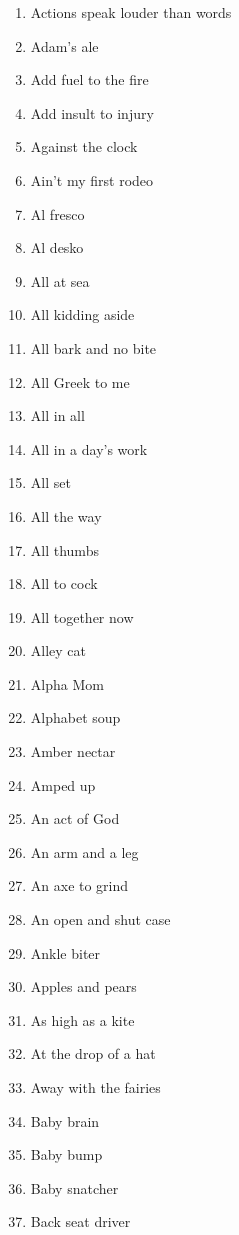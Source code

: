\begin{enumerate}
        \item  Actions speak louder than words
        \item  Adam's ale
        \item  Add fuel to the fire
        \item  Add insult to injury
        \item  Against the clock
        \item  Ain't my first rodeo
        \item  Al fresco
        \item  Al desko
        \item  All at sea
        \item  All kidding aside
        \item  All bark and no bite
        \item  All Greek to me
        \item  All in all
        \item  All in a day's work
        \item  All set
        \item  All the way
        \item  All thumbs
        \item  All to cock
        \item  All together now
        \item  Alley cat
        \item  Alpha Mom
        \item  Alphabet soup
        \item  Amber nectar
        \item  Amped up
        \item  An act of God
        \item  An arm and a leg
        \item  An axe to grind
        \item  An open and shut case
        \item  Ankle biter
        \item  Apples and pears
        \item  As high as a kite
        \item  At the drop of a hat
        \item  Away with the fairies
        \item  Baby brain
        \item  Baby bump
        \item  Baby snatcher
        \item  Back seat driver

\end{enumerate}
